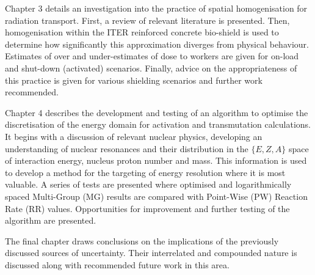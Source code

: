 Chapter 3 details an investigation into the practice of spatial homogenisation for radiation transport. First, a review of relevant literature is presented. Then, homogenisation within the ITER reinforced concrete bio-shield is used to determine how significantly this approximation diverges from physical behaviour. Estimates of over and under-estimates of dose to workers are given for on-load and shut-down (activated) scenarios. Finally, advice on the appropriateness of this practice is given for various shielding scenarios and further work recommended.

Chapter 4 describes the development and testing of an algorithm to optimise the discretisation of the energy domain for activation and transmutation calculations. It begins with a discussion of relevant nuclear physics, developing an understanding of nuclear resonances and their distribution in the $\{E, Z, A\}$ space of interaction energy, nucleus proton number and mass. This information is used to develop a method for the targeting of energy resolution where it is most valuable. A series of tests are presented where optimised and logarithmically spaced Multi-Group (MG)  results are compared with Point-Wise (PW)  Reaction Rate (RR)  values. Opportunities for improvement and further testing of the algorithm are presented.

The final chapter draws conclusions on the implications of the previously discussed sources of uncertainty. Their interrelated and compounded nature is discussed along with recommended future work in this area.

